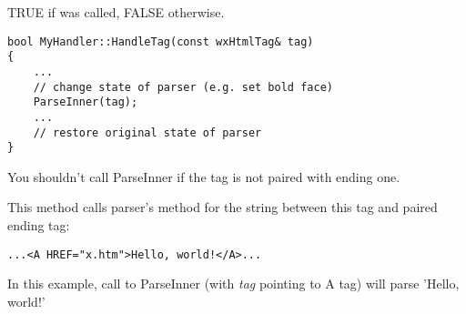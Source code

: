 
TRUE if  was called,
FALSE otherwise.


\begin{verbatim}
bool MyHandler::HandleTag(const wxHtmlTag& tag)
{
    ...
    // change state of parser (e.g. set bold face)
    ParseInner(tag);
    ...
    // restore original state of parser
}
\end{verbatim}

You shouldn't call ParseInner if the tag is not paired with ending one.


\label{wxhtmltaghandlerparseinner}


This method calls parser's  method
for the string between this tag and paired ending tag:

\begin{verbatim}
...<A HREF="x.htm">Hello, world!</A>...
\end{verbatim}

In this example, call to ParseInner (with {\it tag} pointing to A tag)
will parse 'Hello, world!'
